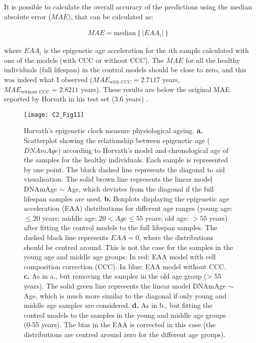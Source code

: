 It is possible to calculate the overall accuracy of the predictions using the median absolute error ($MAE)$, that can be calculated as:

\begin{align}
 	MAE = \mathrm{median}\left\{|EAA_i|\right\}
\end{align}

where $EAA_i$ is the epigenetic age acceleration for the $i$th sample calculated with one of the models (with CCC or without CCC). The $MAE$ for all the healthy individuals (full lifespan) in the control models should be close to zero, and this was indeed what I observed ($MAE_{\text{with CCC}} = 2.7117$ years, $MAE_{\text{without CCC}} = 2.8211$ years). These results are below the original MAE reported by Horvath in his test set (3.6 years) \cite{Horvath2013}. 

\begin{figure}[htbp!] 
	\centering
	\texttt{[image: C2\_Fig11]}
	\vspace*{2mm}    
	\caption[Horvath's epigenetic clock measure physiological ageing]{Horvath's epigenetic clock measure physiological ageing. \textbf{a.} Scatterplot showing the relationship between epigenetic age ($DNAmAge$) according to Horvath’s model \cite{Horvath2013} and chronological age of the samples for the healthy individuals. Each sample is represented by one point. The black dashed line represents the diagonal to aid visualisation. The solid brown line represents the linear model DNAmAge $\sim$ Age, which deviates from the diagonal if the full lifespan samples are used. \textbf{b.} Boxplots displaying the epigenetic age acceleration (EAA) distributions for different age ranges (young age: $\leq 20$ years; middle age: $20 < Age \leq 55$ years; old age: $> 55$ years) after fitting the control models to the full lifespan samples. The dashed black line represents $EAA = 0$, where the distributions should be centred around. This is not the case for the samples in the young age and middle age groups. In red: EAA model with cell composition correction (CCC). In blue: EAA model without CCC. \textbf{c.} As in a., but removing the samples in the old age group (> 55 years). The solid green line represents the linear model DNAmAge $\sim$ Age, which is much more similar to the diagonal if only young and middle age samples are considered. \textbf{d.} As in b., but fitting the control models to the samples in the young and middle age groups (0-55 years). The bias in the EAA is corrected in this case (the distributions are centred around zero for the different age groups).}
	\label{fig:c2_fig11}
\end{figure}   

